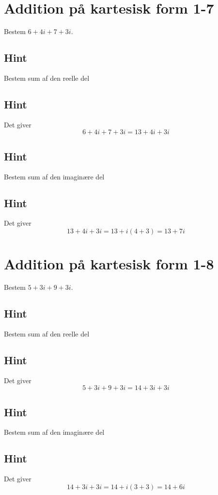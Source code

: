 \documentclass{article}
\newenvironment{exercise}[1]{\newpage\section{#1}}{}
\newcommand{\answerbox}[1]{\fbox{$#1$}}
\newcommand{\hint}{\subsection*{Hint}}
\begin{document}
\newpage

\begin{exercise}{Addition på kartesisk form 1-7}
	
	Bestem $6+4i+7+3i$.
	
	\answerbox{13  + 7i}
	
	\hint
	
	Bestem sum af den reelle del
	
	\hint
	
	Det giver
	\[
	6+4i+7+3i = 13 + 4i +3i
	\]
	
	\hint
	
	Bestem sum af den imaginære del 
	
	
	\hint
	
	Det giver 
	\[
	13 + 4i +3i = 13 + i(4+3) = 13  + 7i
	\]
	
\end{exercise}

\newpage

\begin{exercise}{Addition på kartesisk form 1-8}
	
	Bestem $5+3i+9+3i$.
	
	\answerbox{14 + 6i}
	
	\hint
	
	Bestem sum af den reelle del
	
	\hint
	
	Det giver
	\[
	5+3i+9+3i = 14 + 3i + 3i
	\]
	
	\hint
	
	Bestem sum af den imaginære del 
	
	
	\hint
	
	Det giver 
	\[
	14 + 3i + 3i = 14 + i(3+3)= 14 + 6i
	\]
	
\end{exercise}
\end{document}
